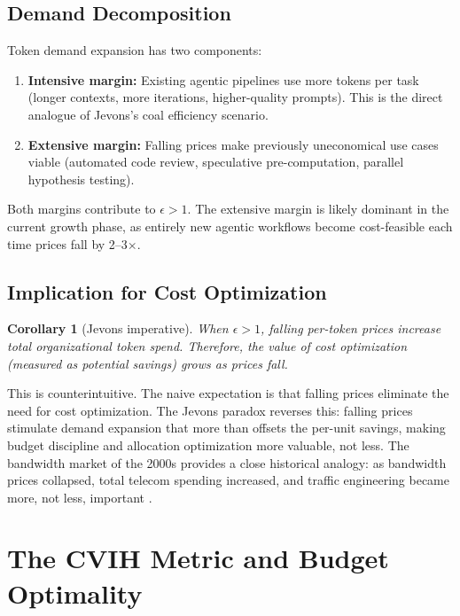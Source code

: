 \documentclass[11pt, a4paper, logo, copyright]{googledeepmind}
\newtheorem{corollary}{Corollary}[section]
\begin{document}
\subsection{Demand Decomposition}\label{sec:jevons-demand}

Token demand expansion has two components:
\begin{enumerate}[nosep]
    \item \textbf{Intensive margin:} Existing agentic pipelines use more tokens per task (longer contexts, more iterations, higher-quality prompts). This is the direct analogue of Jevons's coal efficiency scenario.
    \item \textbf{Extensive margin:} Falling prices make previously uneconomical use cases viable (automated code review, speculative pre-computation, parallel hypothesis testing).
\end{enumerate}

Both margins contribute to $\epsilon > 1$. The extensive margin is likely dominant in the current growth phase, as entirely new agentic workflows become cost-feasible each time prices fall by 2--3$\times$.

\subsection{Implication for Cost Optimization}

\begin{corollary}[Jevons imperative]\label{cor:jevons}
When $\epsilon > 1$, falling per-token prices \emph{increase} total organizational token spend. Therefore, the value of cost optimization (measured as potential savings) grows as prices fall.
\end{corollary}

This is counterintuitive. The naive expectation is that falling prices eliminate the need for cost optimization. The Jevons paradox reverses this: falling prices stimulate demand expansion that more than offsets the per-unit savings, making budget discipline and allocation optimization more valuable, not less. The bandwidth market of the 2000s provides a close historical analogy: as bandwidth prices collapsed, total telecom spending increased, and traffic engineering became more, not less, important \citep{sorrell2009}.


\section{The CVIH Metric and Budget Optimality}\label{sec:cvih}
\end{document}
